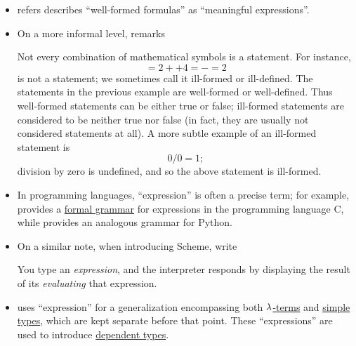 \begin{comments}
\begin{itemize}
    \item {} refers describes \enquote{well-formed formulas} as \enquote{meaningful expressions}.

    \item On a more informal level,  remarks
    \begin{displayquote}
      Not every combination of mathematical symbols is a statement. For instance,
      \begin{equation*}
        = 2 ++ 4 = - = 2
      \end{equation*}
      is not a statement; we sometimes call it ill-formed or ill-defined. The statements in the previous example are well-formed or well-defined. Thus well-formed statements can be either true or false; ill-formed statements are considered to be neither true
      nor false (in fact, they are usually not considered statements at all). A more subtle example of an ill-formed statement is
      \begin{equation*}
        0 / 0 = 1;
      \end{equation*}
      division by zero is undefined, and so the above statement is ill-formed.
    \end{displayquote}

    \item In programming languages, \enquote{expression} is often a precise term; for example, \cite[\S 6.5]{ISO:9899:2018} provides a \hyperref[def:formal_grammar]{formal grammar} for expressions in the programming language C, while \cite{PythonDocs:3.13:expressions} provides an analogous grammar for Python.

    \item On a similar note, when introducing Scheme,  write
    \begin{displayquote}
      You type an \textit{expression}, and the interpreter responds by displaying the result of its \textit{evaluating} that expression.
    \end{displayquote}

    \item {} uses \enquote{expression} for a generalization encompassing both \hyperref[def:lambda_term]{\( \mathrm{\lambda} \)-terms} and \hyperref[def:simple_type]{simple types}, which are kept separate before that point. These \enquote{expressions} are used to introduce \hyperref[rem:dependent_types]{dependent types}.
  \end{itemize}
\end{comments}

